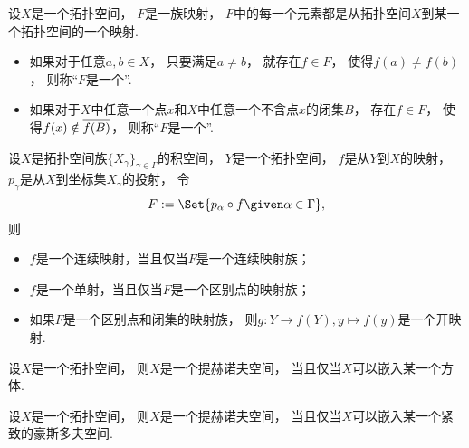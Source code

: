 \begin{definition}
设\(X\)是一个拓扑空间，
\(F\)是一族映射，
\(F\)中的每一个元素都是从拓扑空间\(X\)到某一个拓扑空间的一个映射.
\begin{itemize}
	\item 如果对于任意\(a,b \in X\)，
	只要满足\(a \neq b\)，
	就存在\(f \in F\)，
	使得\(f(a) \neq f(b)\)，
	则称“\(F\)是一个”.

	\item 如果对于\(X\)中任意一个点\(x\)和\(X\)中任意一个不含点\(x\)的闭集\(B\)，
	存在\(f \in F\)，
	使得\(f(x) \notin \overline{f(B)}\)，
	则称“\(F\)是一个”.
\end{itemize}
\end{definition}

\begin{lemma}
设\(X\)是拓扑空间族\(\{X_\gamma\}_{\gamma \in \Gamma}\)的积空间，
\(Y\)是一个拓扑空间，
\(f\)是从\(Y\)到\(X\)的映射，
\(p_\gamma\)是从\(X\)到坐标集\(X_\gamma\)的投射，
令\begin{equation*}
	F \defeq \Set{
		p_\alpha \circ f
		\given
		\alpha \in \Gamma
	},
\end{equation*}
则\begin{itemize}
	\item \(f\)是一个连续映射，当且仅当\(F\)是一个连续映射族；
	\item \(f\)是一个单射，当且仅当\(F\)是一个区别点的映射族；
	\item 如果\(F\)是一个区别点和闭集的映射族，
	则\(g\colon Y \to f(Y), y \mapsto f(y)\)是一个开映射.
\end{itemize}
\end{lemma}

\begin{theorem}
设\(X\)是一个拓扑空间，
则\(X\)是一个提赫诺夫空间，
当且仅当\(X\)可以嵌入某一个方体.
\end{theorem}

\begin{theorem}
设\(X\)是一个拓扑空间，
则\(X\)是一个提赫诺夫空间，
当且仅当\(X\)可以嵌入某一个紧致的豪斯多夫空间.
\end{theorem}
